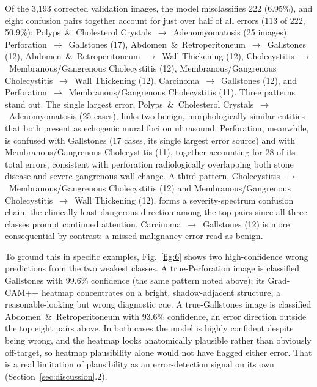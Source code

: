 Of the 3,193 corrected validation images, the model misclassifies 222 (6.95\%), and eight confusion pairs together account for just over half of all errors (113 of 222, 50.9\%): Polyps~\&~Cholesterol Crystals~$\rightarrow$~Adenomyomatosis (25 images), Perforation~$\rightarrow$~Gallstones (17), Abdomen~\&~Retroperitoneum~$\rightarrow$~Gallstones (12), Abdomen~\&~Retroperitoneum~$\rightarrow$~Wall Thickening (12), Cholecystitis~$\rightarrow$~Membranous/Gangrenous Cholecystitis (12), Membranous/Gangrenous Cholecystitis~$\rightarrow$~Wall Thickening (12), Carcinoma~$\rightarrow$~Gallstones (12), and Perforation~$\rightarrow$~Membranous/Gangrenous Cholecystitis (11). Three patterns stand out. The single largest error, Polyps~\&~Cholesterol Crystals~$\rightarrow$~Adenomyomatosis (25 cases), links two benign, morphologically similar entities that both present as echogenic mural foci on ultrasound. Perforation, meanwhile, is confused with Gallstones (17 cases, its single largest error source) and with Membranous/Gangrenous Cholecystitis (11), together accounting for 28 of its total errors, consistent with perforation radiologically overlapping both stone disease and severe gangrenous wall change. A third pattern, Cholecystitis~$\rightarrow$~Membranous/Gangrenous Cholecystitis (12) and Membranous/Gangrenous Cholecystitis~$\rightarrow$~Wall Thickening (12), forms a severity-spectrum confusion chain, the clinically least dangerous direction among the top pairs since all three classes prompt continued attention. Carcinoma~$\rightarrow$~Gallstones (12) is more consequential by contrast: a missed-malignancy error read as benign.

To ground this in specific examples, Fig.~\ref{fig:6} shows two high-confidence wrong predictions from the two weakest classes. A true-Perforation image is classified Gallstones with 99.6\% confidence (the same pattern noted above); its Grad-CAM++ heatmap concentrates on a bright, shadow-adjacent structure, a reasonable-looking but wrong diagnostic cue. A true-Gallstones image is classified Abdomen~\&~Retroperitoneum with 93.6\% confidence, an error direction outside the top eight pairs above. In both cases the model is highly confident despite being wrong, and the heatmap looks anatomically plausible rather than obviously off-target, so heatmap plausibility alone would not have flagged either error. That is a real limitation of plausibility as an error-detection signal on its own (Section~\ref{sec:discussion}.2).

